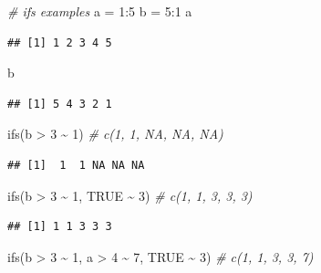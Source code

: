 \documentclass[
]{book}
\newenvironment{Shaded}{\begin{snugshade}}{\end{snugshade}}
\newcommand{\CommentTok}[1]{\textcolor[rgb]{0.56,0.35,0.01}{\textit{#1}}}
\newcommand{\ConstantTok}[1]{\textcolor[rgb]{0.00,0.00,0.00}{#1}}
\newcommand{\DecValTok}[1]{\textcolor[rgb]{0.00,0.00,0.81}{#1}}
\newcommand{\FunctionTok}[1]{\textcolor[rgb]{0.00,0.00,0.00}{#1}}
\newcommand{\NormalTok}[1]{#1}
\newcommand{\OtherTok}[1]{\textcolor[rgb]{0.56,0.35,0.01}{#1}}
\newcommand{\SpecialCharTok}[1]{\textcolor[rgb]{0.00,0.00,0.00}{#1}}
\begin{document}
\begin{Shaded}
\begin{Highlighting}[]
\CommentTok{\# \textquotesingle{}ifs\textquotesingle{} examples}
\NormalTok{a }\OtherTok{=} \DecValTok{1}\SpecialCharTok{:}\DecValTok{5}
\NormalTok{b }\OtherTok{=} \DecValTok{5}\SpecialCharTok{:}\DecValTok{1}
\NormalTok{a}
\end{Highlighting}
\end{Shaded}

\begin{verbatim}
## [1] 1 2 3 4 5
\end{verbatim}

\begin{Shaded}
\begin{Highlighting}[]
\NormalTok{b}
\end{Highlighting}
\end{Shaded}

\begin{verbatim}
## [1] 5 4 3 2 1
\end{verbatim}

\begin{Shaded}
\begin{Highlighting}[]
\FunctionTok{ifs}\NormalTok{(b }\SpecialCharTok{\textgreater{}} \DecValTok{3} \SpecialCharTok{\textasciitilde{}} \DecValTok{1}\NormalTok{)  }\CommentTok{\# c(1, 1, NA, NA, NA)}
\end{Highlighting}
\end{Shaded}

\begin{verbatim}
## [1]  1  1 NA NA NA
\end{verbatim}

\begin{Shaded}
\begin{Highlighting}[]
\FunctionTok{ifs}\NormalTok{(b }\SpecialCharTok{\textgreater{}} \DecValTok{3} \SpecialCharTok{\textasciitilde{}} \DecValTok{1}\NormalTok{, }\ConstantTok{TRUE} \SpecialCharTok{\textasciitilde{}} \DecValTok{3}\NormalTok{)  }\CommentTok{\# c(1, 1, 3, 3, 3)}
\end{Highlighting}
\end{Shaded}

\begin{verbatim}
## [1] 1 1 3 3 3
\end{verbatim}

\begin{Shaded}
\begin{Highlighting}[]
\FunctionTok{ifs}\NormalTok{(b }\SpecialCharTok{\textgreater{}} \DecValTok{3} \SpecialCharTok{\textasciitilde{}} \DecValTok{1}\NormalTok{, a }\SpecialCharTok{\textgreater{}} \DecValTok{4} \SpecialCharTok{\textasciitilde{}} \DecValTok{7}\NormalTok{, }\ConstantTok{TRUE} \SpecialCharTok{\textasciitilde{}} \DecValTok{3}\NormalTok{)  }\CommentTok{\# c(1, 1, 3, 3, 7)}
\end{Highlighting}
\end{Shaded}
\end{document}
